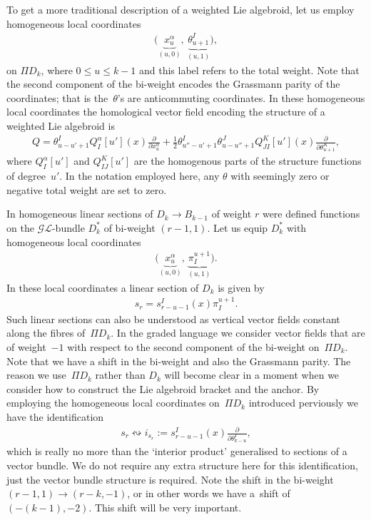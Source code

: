 \documentclass[pdftex]{sigma}
\numberwithin{equation}{section}
\begin{document}
To get a more traditional description of a weighted Lie algebroid, let us employ homogeneous local coordinates
\begin{gather*}
\big(\underbrace{x^{\alpha}_{u}}_{(u,0)}, \, \underbrace{\theta^{I}_{u+1}}_{(u,1)}\big),
\end{gather*}
on $\Pi D_{k}$, where  $0 \leq u \leq k-1$ and this label refers to the total weight. Note that the second component of the bi-weight encodes the Grassmann parity of the coordinates; that is the~$\theta$'s are anticommuting coordinates. In these homogeneous local coordinates the homological vector f\/ield encoding the structure of a weighted Lie algebroid is
\begin{gather*}
Q = \theta^{I}_{u-u'+1}Q_{I}^{\alpha}[u'](x) \frac{\partial}{\partial x^{\alpha}_{u} }  + \frac{1}{2} \theta^{I}_{u''-u'+1} \theta^{J}_{u-u''+1}Q_{JI}^{K}[u'](x)\frac{\partial}{\partial \theta_{u+1}^{K} } ,
\end{gather*}
 where $Q_{I}^{\alpha}[u']$ and $Q_{IJ}^{K}[u']$ are the homogenous parts of the structure functions of degree~$u'$. In the notation employed here, any  $\theta$ with seemingly zero or negative total weight  are set to zero.

In \cite{Bruce:2014} homogeneous  linear sections of $D_{k} \rightarrow B_{k-1}$ of weight $r$ were def\/ined functions on the $\mathcal{GL}$-bundle  $D_{k}^{*}$ of bi-weight $(r-1, 1)$. Let us equip $D_{k}^{*}$ with homogeneous local coordinates
\begin{gather*}
\big(\underbrace{x^{\alpha}_{u}}_{(u,0)}, \, \underbrace{\pi_{I}^{u+1}}_{(u,1)}\big).
\end{gather*}
  In these local coordinates a linear section of $D_{k}$ is given by
\begin{gather*}
s_{r}= s_{r-u-1}^{I}(x)\pi_{I}^{u+1}.
\end{gather*}
 Such linear  sections can also be understood as vertical vector f\/ields constant along the f\/ibres  of~$\Pi D_{k}$. In the graded language we consider vector f\/ields that are of weight~$-1$ with respect to the second component of the bi-weight on~$\Pi D_{k}$.  Note that we have a shift in the bi-weight and also the Grassmann parity.  The reason we use~$\Pi D_{k}$ rather than $D_{k}$ will become clear in a moment when we consider how to construct the Lie algebroid bracket and the anchor. By employing  the homogeneous local coordinates on~$\Pi D_{k}$ introduced perviously we have the identif\/ication
\begin{gather*}
s_{r} \leftrightsquigarrow i_{s_{r}}:= s^{I}_{r-u-1}(x)\frac{\partial}{\partial \theta_{k-u}^{I}} ,
\end{gather*}
 which is really no more than the `interior product' generalised to sections of a vector bundle. We do not require any extra structure here for this identif\/ication, just the vector bundle structure is required. Note the shift in the bi-weight $(r-1,1)\rightarrow (r-k,-1)$, or in other words we have a~shift  of $(-(k-1), -2)$. This shift will be very important.
\end{document}
